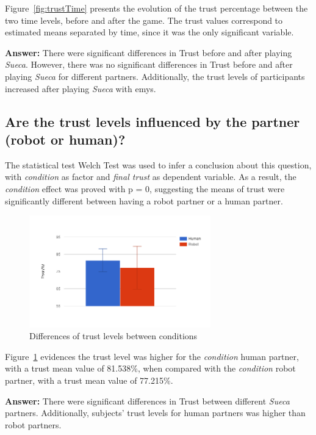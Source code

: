 Figure~\ref{fig:trustTime} presents the evolution of the trust percentage between the two time levels, before and after the game.
The trust values correspond to estimated means separated by time, since it was the only significant variable.

\textbf{Answer:} There were significant differences in Trust before and after playing \emph{Sueca}.
However, there was no significant differences in Trust before and after playing \emph{Sueca} for different partners.
Additionally, the trust levels of participants increased after playing \emph{Sueca} with \ac{emys}.



\subsection*{Are the trust levels influenced by the partner (robot or human)?}
The statistical test Welch Test was used to infer a conclusion about this question, with \emph{condition} as factor and \emph{final trust} as dependent variable.
As a result, the \emph{condition} effect was proved with p = 0, suggesting the means of trust were significantly different between having a robot partner or a human partner.

\begin{figure}[h!]
  \centering
    \includegraphics[width=0.7\textwidth]{./img/7/trustCondition}
  \caption{Differences of trust levels between conditions}
\label{fig:trustCondition}
\end{figure}

Figure~\ref{fig:trustCondition} evidences the trust level was higher for the \emph{condition} human partner, with a trust mean value of 81.538\%, when compared with the \emph{condition} robot partner, with a trust mean value of 77.215\%.

\textbf{Answer:} There were significant differences in Trust between different \emph{Sueca} partners.
Additionally, subjects' trust levels for human partners was higher than robot partners.


